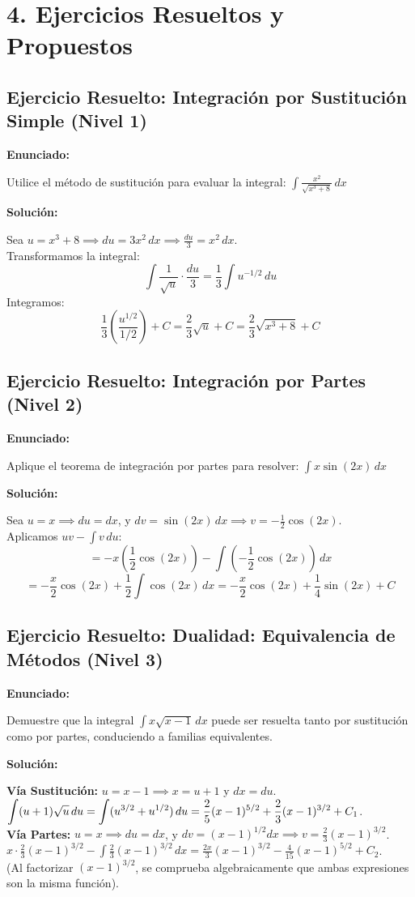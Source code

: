\documentclass[11pt]{article}
\newenvironment{ejercicios}{\section*{4. Ejercicios Resueltos y Propuestos}}{}
\newenvironment{ejercicioresuelto}[2]{\subsection*{Ejercicio Resuelto: #1 \hfill \normalfont\small(#2)}}{ }
\newcommand{\enunciado}[1]{\textbf{Enunciado:}\par#1\par\medskip}
\newcommand{\solucion}[1]{\textbf{Solución:}\par#1\par\bigskip}
\begin{document}
\begin{ejercicios}

  \begin{ejercicioresuelto}{Integración por Sustitución Simple}{Nivel 1}
    \enunciado{Utilice el método de sustitución para evaluar la integral: $\displaystyle\int \frac{x^2}{\sqrt{x^3 + 8}} \, dx$}
    \solucion{
      Sea $\displaystyle u = x^3 + 8 \implies du = 3x^2 \, dx \implies \frac{du}{3} = x^2 \, dx$. \\
      Transformamos la integral: 
      \[ \displaystyle\int \frac{1}{\sqrt{u}} \cdot \frac{du}{3} = \frac{1}{3} \displaystyle\int u^{-1/2} \, du \]
      Integramos: 
      \[ \displaystyle \frac{1}{3} \left( \frac{u^{1/2}}{1/2} \right) + C = \frac{2}{3}\sqrt{u} + C = \frac{2}{3}\sqrt{x^3 + 8} + C \]
    }
  \end{ejercicioresuelto}

  \begin{ejercicioresuelto}{Integración por Partes}{Nivel 2}
    \enunciado{Aplique el teorema de integración por partes para resolver: $\displaystyle\int x \sin(2x) \, dx$}
    \solucion{
      Sea $\displaystyle u = x \implies du = dx$, y $\displaystyle dv = \sin(2x) \, dx \implies v = -\frac{1}{2}\cos(2x)$. \\
      Aplicamos $uv - \displaystyle\int v \, du$:
      \[ = \displaystyle -x \left(\frac{1}{2}\cos(2x)\right) - \displaystyle\int \left(-\frac{1}{2}\cos(2x)\right) \, dx \]
      \[ = \displaystyle -\frac{x}{2}\cos(2x) + \frac{1}{2} \displaystyle\int \cos(2x) \, dx = -\frac{x}{2}\cos(2x) + \frac{1}{4}\sin(2x) + C \]
    }
  \end{ejercicioresuelto}

  \begin{ejercicioresuelto}{Dualidad: Equivalencia de Métodos}{Nivel 3}
    \enunciado{Demuestre que la integral $\displaystyle\int x \sqrt{x - 1} \, dx$ puede ser resuelta tanto por sustitución como por partes, conduciendo a familias equivalentes.}
    \solucion{
      \textbf{Vía Sustitución:} $\displaystyle u = x - 1 \implies x = u + 1$ y $\displaystyle dx = du$. \\
      $\displaystyle \displaystyle\int (u + 1)\sqrt{u} \, du = \displaystyle\int (u^{3/2} + u^{1/2}) \, du = \frac{2}{5}(x - 1)^{5/2} + \frac{2}{3}(x - 1)^{3/2} + C_1$. \\
      \textbf{Vía Partes:} $\displaystyle u = x \implies du = dx$, y $\displaystyle dv = (x - 1)^{1/2}dx \implies v = \frac{2}{3}(x - 1)^{3/2}$. \\
      $\displaystyle x \cdot \frac{2}{3}(x - 1)^{3/2} - \displaystyle\int \frac{2}{3}(x - 1)^{3/2} \, dx = \frac{2x}{3}(x - 1)^{3/2} - \frac{4}{15}(x - 1)^{5/2} + C_2$. \\
      (Al factorizar $(x-1)^{3/2}$, se comprueba algebraicamente que ambas expresiones son la misma función).
    }
  \end{ejercicioresuelto}


\end{ejercicios}
\end{document}
